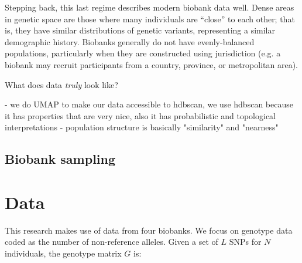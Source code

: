 Stepping back, this last regime describes modern biobank data well. Dense areas in genetic space are those where many individuals are ``close'' to each other; that is, they have similar distributions of genetic variants, representing a similar demographic history. Biobanks generally do not have evenly-balanced populations, particularly when they are constructed using jurisdiction (e.g. a biobank may recruit participants from a country, province, or metropolitan area). 




What does data \emph{truly} look like?






- we do UMAP to make our data accessible to hdbscan, we use hdbscan because it has properties that are very nice, also it has probabilistic and topological interpretations
- population structure is basically "similarity" and "nearness"

\citep{malzer_hybrid_2020}

\cite{mcinnes_accelerated_2017}


\subsection{Biobank sampling}





\section{Data}

This research makes use of data from four biobanks. We focus on genotype data coded as the number of non-reference alleles. Given a set of $L$ SNPs for $N$ individuals, the genotype matrix $G$ is:

